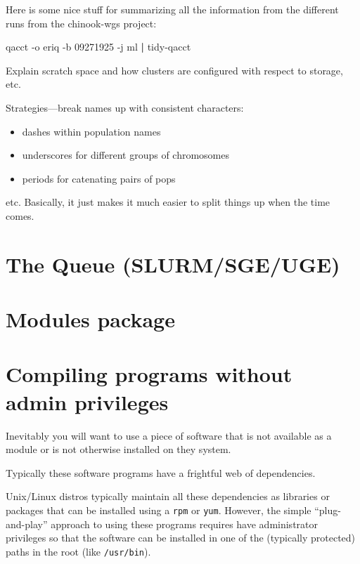 \documentclass[]{krantz}
\makeatletter
\newenvironment{Shaded}{\begin{snugshade}}{\end{snugshade}}
\newcommand{\ExtensionTok}[1]{#1}
\newcommand{\KeywordTok}[1]{\textcolor[rgb]{0.27,0.27,0.27}{\textbf{#1}}}
\newcommand{\NormalTok}[1]{#1}
\providecommand{\tightlist}{%
  \setlength{\itemsep}{0pt}\setlength{\parskip}{0pt}}
\newenvironment{kframe}{%
\medskip{}
\setlength{\fboxsep}{.8em}
 \def\at@end@of@kframe{}%
 \ifinner\ifhmode%
  \def\at@end@of@kframe{\end{minipage}}%
  \begin{minipage}{\columnwidth}%
 \fi\fi%
 \def\FrameCommand##1{\hskip\@totalleftmargin \hskip-\fboxsep
 \colorbox{shadecolor}{##1}\hskip-\fboxsep
     \hskip-\linewidth \hskip-\@totalleftmargin \hskip\columnwidth}%
 \MakeFramed {\advance\hsize-\width
   \@totalleftmargin\z@ \linewidth\hsize
   \@setminipage}}%
 {\par\unskip\endMakeFramed%
 \at@end@of@kframe}
\renewenvironment{Shaded}{\begin{kframe}}{\end{kframe}}
\makeatother
\begin{document}
Here is some nice stuff for summarizing all the information from the different runs from the chinook-wgs project:

\begin{Shaded}
\begin{Highlighting}[]
\ExtensionTok{qacct}\NormalTok{ -o eriq -b 09271925 -j ml }\KeywordTok{|} \ExtensionTok{tidy-qacct}
\end{Highlighting}
\end{Shaded}

Explain scratch space and how clusters are configured with respect to storage, etc.

Strategies---break names up with consistent characters:

\begin{itemize}
\tightlist
\item
  dashes within population names
\item
  underscores for different groups of chromosomes
\item
  periods for catenating pairs of pops
\end{itemize}

etc. Basically, it just makes it much easier to split things up
when the time comes.

\hypertarget{the-queue-slurmsgeuge}{%
\section{The Queue (SLURM/SGE/UGE)}\label{the-queue-slurmsgeuge}}

\hypertarget{modules-package}{%
\section{Modules package}\label{modules-package}}

\hypertarget{compiling-programs-without-admin-privileges}{%
\section{Compiling programs without admin privileges}\label{compiling-programs-without-admin-privileges}}

Inevitably you will want to use a piece of software that is not available as
a module or is not otherwise installed on they system.

Typically these software programs have a frightful web of dependencies.

Unix/Linux distros typically maintain all these dependencies as libraries or packages
that can be installed using a \texttt{rpm} or \texttt{yum}. However, the simple ``plug-and-play'' approach
to using these programs requires have administrator privileges so that the software can
be installed in one of the (typically protected) paths in the root (like \texttt{/usr/bin}).
\end{document}
